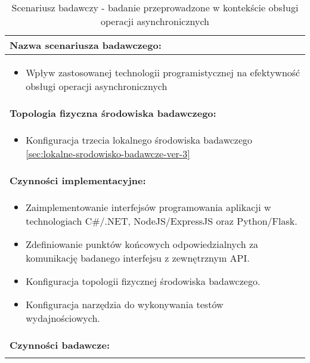 \setlength{\LTcapwidth}{\textwidth}
\setlength\LTleft{0pt}
\setlength\LTright{0pt}
\begin{longtable}[c]{|llll|}
    \caption{Scenariusz badawczy - badanie przeprowadzone w kontekście obsługi operacji asynchronicznych}
    \label{tab:research-scenario-3}                                                  \\ \hline
    \multicolumn{4}{|l|}{\textbf{Nazwa scenariusza badawczego:}}                     \\ \hline
    \multicolumn{4}{|p{\linewidth}|}{
        \begin{itemize}[label={}]
            \item Wpływ zastosowanej technologii programistycznej na efektywność obsługi operacji asynchronicznych
          \end{itemize}
    } \\ \hline
    \multicolumn{4}{|l|}{\textbf{Topologia fizyczna środowiska badawczego:}}         \\ \hline
    \multicolumn{4}{|p{\linewidth}|}{
        \begin{itemize}[label={}]
            \item Konfiguracja trzecia lokalnego środowiska badawczego \ref{sec:lokalne-srodowisko-badawcze-ver-3}
          \end{itemize}
    }\\ \hline
    \multicolumn{4}{|l|}{\textbf{Czynności implementacyjne:}}                        \\ \hline
    \multicolumn{4}{|p{\linewidth}|}{
        \begin{itemize}
            \item Zaimplementowanie interfejsów programowania aplikacji w technologiach C\#/.NET, NodeJS/ExpressJS oraz Python/Flask.
            \item Zdefiniowanie punktów końcowych odpowiedzialnych za komunikację badanego interfejsu z zewnętrznym API.
            \item Konfiguracja topologii fizycznej środowiska badawczego.
            \item Konfiguracja narzędzia do wykonywania testów wydajnościowych.
        \end{itemize}}                                                           \\ \hline
    \multicolumn{4}{|l|}{\textbf{Czynności badawcze:}}                               \\ \hline
    \multicolumn{4}{|p{\linewidth}|}{
        \begin{itemize}

\end{itemize}}
\end{longtable}
